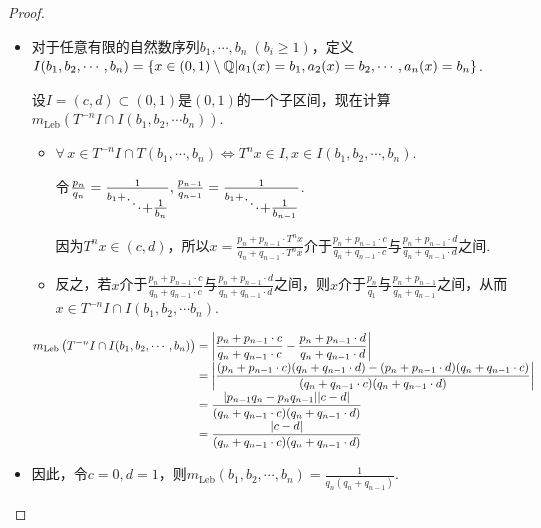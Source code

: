 \begin{proof}
    \begin{itemize}
        \item 对于任意有限的自然数序列$b_1,\cdots,b_n\;(b_i\geq 1)$，定义$I(b_1,b_2,\cdots,b_n)=\{x\in(0,1)\setminus\mathbb{Q}|a_1(x)=b_1,a_2(x)=b_2,\cdots,a_n(x)=b_n\}$. \par
        设$I=(c,d)\subset (0,1)$是$(0,1)$的一个子区间，现在计算$m_\mathrm{Leb}\left(T^{-n}I\cap I(b_1,b_2,\cdots b_n)\right)$.\par
        \begin{itemize}
            \item $\forall\, x\in T^{-n}I\cap T(b_1,\cdots,b_n)\Leftrightarrow T^nx\in I,x\in I(b_1,b_2,\cdots,b_n)$.\par
            令$\frac{p_n}{q_n}=\frac{1}{b_1+\raisebox{-.5\height}{$\ddots$}\raisebox{-1\height}{$+\tfrac{1}{b_n}$}},\frac{p_{n-1}}{q_{n-1}}=\frac{1}{b_1+\raisebox{-.5\height}{$\ddots$}\raisebox{-1\height}{$+\tfrac{1}{b_{n-1}}$}}$.\par
            因为$T^nx\in(c,d)$，所以$x=\frac{p_n+p_{n-1}\cdot T^nx}{q_n+q_{n-1}\cdot T^nx}$介于$\frac{p_n+p_{n-1}\cdot c}{q_n+q_{n-1}\cdot c}$与$\frac{p_n+p_{n-1}\cdot d}{q_n+q_{n-1}\cdot d}$之间.\par
            \item 反之，若$x$介于$\frac{p_n+p_{n-1}\cdot c}{q_n+q_{n-1}\cdot c}$与$\frac{p_n+p_{n-1}\cdot d}{q_n+q_{n-1}\cdot d}$之间，则$x$介于$\frac{p_n}{q_1}$与$\frac{p_n+p_{n-1}}{q_n+q_{n-1}}$之间，从而$x\in T^{-n}I\cap I(b_1,b_2,\cdots b_n)$.
        \end{itemize}
        $\setjot\begin{aligned}[t]
            m_\mathrm{Leb}\left(T^{-n}I\cap I(b_1,b_2,\cdots,b_n)\right)&=\left|\frac{p_n+p_{n-1}\cdot c}{q_n+q_{n-1}\cdot c}-\frac{p_n+p_{n-1}\cdot d}{q_n+q_{n-1}\cdot d}\right| \\
            &= \left|\frac{(p_n+p_{n-1}\cdot c)(q_n+q_{n-1}\cdot d)-(p_n+p_{n-1}\cdot d)(q_n+q_{n-1}\cdot c)}{(q_n+q_{n-1}\cdot c)(q_n+q_{n-1}\cdot d)}\right| \\
            &=\frac{|p_{n-1}q_n-p_nq_{n-1}||c-d|}{(q_n+q_{n-1}\cdot c)(q_n+q_{n-1}\cdot d)} \\
            &= \frac{|c-d|}{(q_n+q_{n-1}\cdot c)(q_n+q_{n-1}\cdot d)}
        \end{aligned}$
        \item 因此，令$c=0,d=1$，则$m_\mathrm{Leb}\left(b_1,b_2,\cdots,b_n\right)=\frac{1}{q_n(q_n+q_{n-1})}$.\par

\end{itemize}
\end{proof}
